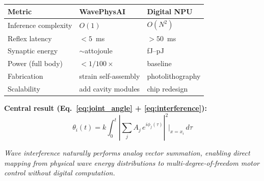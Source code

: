 \documentclass[12pt, a4paper]{article}
\begin{document}
\begin{center}
\begin{tabular}{lll}
\toprule
\textbf{Metric} & \textbf{WavePhysAI} & \textbf{Digital NPU} \\
\midrule
Inference complexity  & $O(1)$              & $O(N^2)$ \\
Reflex latency        & $< 5$~ms            & $> 50$~ms \\
Synaptic energy       & $\sim$attojoule     & fJ--pJ \\
Power (full body)     & $< 1/100\times$     & baseline \\
Fabrication           & strain self-assembly & photolithography \\
Scalability           & add cavity modules  & chip redesign \\
\bottomrule
\end{tabular}
\end{center}

\bigskip

\textbf{Central result (Eq.~\ref{eq:joint_angle} + \ref{eq:interference}):}
\begin{equation}\label{eq:central}
  \boxed{
    \theta_i(t) = k \int_0^t
    \left|\sum_j A_j\,e^{i\phi_j(\tau)}\right|^2 \bigg|_{x=x_i}
    \,d\tau
  }
\end{equation}

\emph{Wave interference naturally performs analog vector summation,
enabling direct mapping from physical wave energy distributions to
multi-degree-of-freedom motor control without digital computation.}
\end{document}
